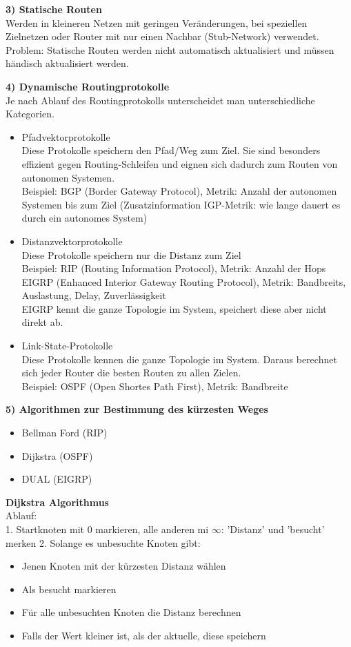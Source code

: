 \textbf{3) Statische Routen} \\
Werden in kleineren Netzen mit geringen Veränderungen, bei speziellen Zielnetzen oder Router mit nur einen Nachbar (Stub-Network) verwendet. \\
Problem: Statische Routen werden nicht automatisch aktualisiert und müssen händisch aktualisiert werden.

\textbf{4) Dynamische Routingprotokolle} \\
Je nach Ablauf des Routingprotokolls unterscheidet man unterschiedliche Kategorien.
\begin{itemize}
	\item Pfadvektorprotokolle \\
	Diese Protokolle speichern den Pfad/Weg zum Ziel. Sie sind besonders effizient gegen Routing-Schleifen und eignen sich dadurch zum Routen von autonomen Systemen. \\
	Beispiel: BGP (Border Gateway Protocol), Metrik: Anzahl der autonomen Systemen bis zum Ziel (Zusatzinformation IGP-Metrik: wie lange dauert es durch ein autonomes System)
	\item Distanzvektorprotokolle \\
	Diese Protokolle speichern nur die Distanz zum Ziel \\
	Beispiel: RIP (Routing Information Protocol), Metrik: Anzahl der Hops \\
	EIGRP (Enhanced Interior Gateway Routing Protocol), Metrik: Bandbreits, Auslastung, Delay, Zuverlässigkeit \\
	EIGRP kennt die ganze Topologie im System, speichert diese aber nicht direkt ab.
	\item Link-State-Protokolle \\
	Diese Protokolle kennen die ganze Topologie im System. Daraus berechnet sich jeder Router die besten Routen zu allen Zielen. \\
	Beispiel: OSPF (Open Shortes Path First), Metrik: Bandbreite
\end{itemize}

\textbf{5) Algorithmen zur Bestimmung des kürzesten Weges}
\begin{itemize}
	\item Bellman Ford (RIP)
	\item Dijkstra (OSPF)
	\item DUAL (EIGRP)
\end{itemize}

\textbf{Dijkstra Algorithmus} \\
Ablauf: \\
1. Startknoten mit 0 markieren, alle anderen mi $\infty$: 'Distanz' und 'besucht' merken
2. Solange es unbesuchte Knoten gibt:
\begin{itemize}
	\item Jenen Knoten mit der kürzesten Distanz wählen
	\item Als besucht markieren
	\item Für alle unbesuchten Knoten die Distanz berechnen
	\item Falls der Wert kleiner ist, als der aktuelle, diese speichern
\end{itemize} 